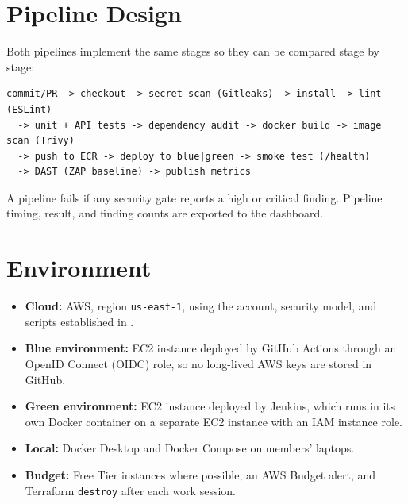 \section{Pipeline Design}
Both pipelines implement the same stages so they can be compared stage by stage:
\begin{verbatim}
commit/PR -> checkout -> secret scan (Gitleaks) -> install -> lint (ESLint)
  -> unit + API tests -> dependency audit -> docker build -> image scan (Trivy)
  -> push to ECR -> deploy to blue|green -> smoke test (/health)
  -> DAST (ZAP baseline) -> publish metrics
\end{verbatim}
A pipeline fails if any security gate reports a high or critical finding.
Pipeline timing, result, and finding counts are exported to the dashboard.

\section{Environment}
\begin{itemize}
\item \textbf{Cloud:} AWS, region \texttt{us-east-1}, using the account,
security model, and scripts established in .
\item \textbf{Blue environment:} EC2 instance deployed by GitHub Actions
through an OpenID Connect (OIDC) role, so no long-lived AWS keys are stored in
GitHub.
\item \textbf{Green environment:} EC2 instance deployed by Jenkins, which runs
in its own Docker container on a separate EC2 instance with an IAM instance
role.
\item \textbf{Local:} Docker Desktop and Docker Compose on members' laptops.
\item \textbf{Budget:} Free Tier instances where possible, an AWS Budget alert,
and Terraform \texttt{destroy} after each work session.
\end{itemize}

